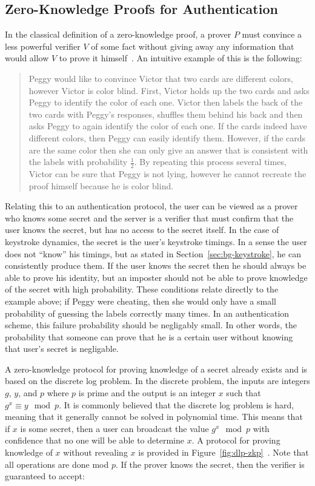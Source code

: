\documentclass[11pt]{article}
\begin{document}
\subsection{Zero-Knowledge Proofs for Authentication}
\label{fig:bg-zkp}
In the classical definition of a zero-knowledge proof, a prover $P$ must convince a less powerful verifier $V$ of some fact without giving away any information that would allow $V$ to prove it himself~\cite{GMW86}. An intuitive example of this is the following:

\begin{quote}\small
Peggy would like to convince Victor that two cards are different colors, however Victor is color blind. First, Victor holds up the two cards and asks Peggy to identify the color of each one. Victor then labels the back of the two cards with Peggy's responses, shuffles them behind his back and then asks Peggy to again identify the color of each one. If the cards indeed have different colors, then Peggy can easily identify them. However, if the cards are the same color then she can only give an answer that is consistent with the labels with probability $\frac12$. By repeating this process several times, Victor can be sure that Peggy is not lying, however he cannot recreate the proof himself because he is color blind.
\end{quote}

\noindent Relating this to an authentication protocol, the user can be viewed as a prover who knows some secret and the server is a verifier that must confirm that the user knows the secret, but has no access to the secret itself. In the case of keystroke dynamics, the secret is the user's keystroke timings. In a sense the user does not ``know'' his timings, but as stated in Section~\ref{sec:bg-keystroke}, he can consistently produce them. If the user knows the secret then he should always be able to prove his identity, but an imposter should not be able to prove knowledge of the secret with high probability. These conditions relate directly to the example above; if Peggy were cheating, then she would only have a small probability of guessing the labels correctly many times. In an authentication scheme, this failure probability should be negligably small. In other words, the probability that someone can prove that he is a certain user without knowing that user's secret is negligable.

A zero-knowledge protocol for proving knowledge of a secret already exists and is based on the discrete log problem. In the discrete problem, the inputs are integers $g$, $y$, and $p$ where $p$ is prime and the output is an integer $x$ such that $g^x\equiv y\mod p$. It is commonly believed that the discrete log problem is hard, meaning that it generally cannot be solved in polynomial time. This means that if $x$ is some secret, then a user can broadcast the value $g^x\mod p$ with confidence that no one will be able to determine $x$. A protocol for proving knowledge of $x$ without revealing $x$ is provided in Figure~\ref{fig:dlp-zkp}~\cite{crypto-1986-1125}. Note that all operations are done mod $p$. If the prover knows the secret, then the verifier is guaranteed to accept:
\end{document}
